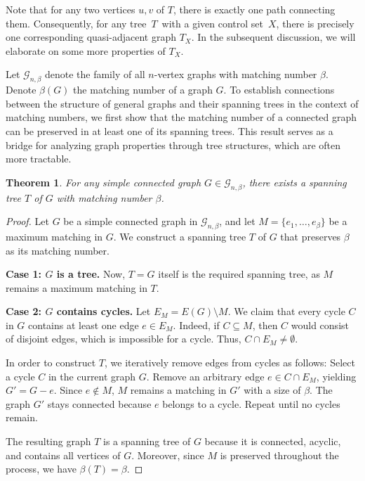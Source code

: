 \documentclass[12pt]{amsart}
\newtheorem{thm}{Theorem}[section]
\begin{document}
Note that for any two vertices \(u, v\) of $T$,  there is exactly one path connecting them. 
Consequently, for any tree $T$ with a given control set $X$, there is precisely one corresponding quasi-adjacent graph $T_X$. 
In the subsequent discussion, we will elaborate on some more properties of $T_X$.




Let $\mathcal{G}_{n,\beta}$ denote the family of all $n$-vertex graphs with matching number $\beta$. 
Denote  \( \beta(G)\) the matching number of a graph $G$.
To establish connections between the structure of general graphs and their spanning trees in the context of matching numbers, we first show that the matching number of a connected graph can be preserved in at least one of its spanning trees. This result serves as a bridge for analyzing graph properties through tree structures, which are often more tractable.
\begin{thm}\label{spanning_tree}
For any simple connected graph \( G \in \mathcal{G}_{n,\beta} \), there exists a spanning tree \( T \) of \( G \) with matching number \( \beta \).
\end{thm}

\begin{proof}
Let \( G \) be a simple connected graph in \( \mathcal{G}_{n,\beta} \), and let \( M = \{e_1, \dots, e_\beta\} \) be a maximum matching in \( G \). We construct a spanning tree \( T \) of \( G \) that preserves \( \beta \) as its matching number.

\textbf{Case 1: \( G \) is a tree.}  
Now, \( T = G \) itself is the required spanning tree, as \( M \) remains a maximum matching in \( T \).

\textbf{Case 2: \( G \) contains cycles.}  
Let \( E_M = E(G) \setminus M \). We claim that every cycle \( C \) in \( G \) contains at least one edge \( e \in E_M \). Indeed, if \( C \subseteq M \), then \( C \) would consist of disjoint edges, which is impossible for a cycle. Thus, \( C \cap E_M \neq \emptyset \).

In order to construct \( T \), we iteratively remove edges from cycles as follows:
Select a cycle \( C \) in the current graph $G$.
Remove an arbitrary edge \( e \in C \cap E_M \), yielding \( G' = G - e \).
Since \( e \notin M \),  \( M \) remains a matching in \( G' \) with a size of $\beta$.
The graph \( G' \) stays connected because \( e \) belongs to a cycle.
Repeat until no cycles remain.


The resulting graph \( T \) is a spanning tree of \( G \) because it is connected, acyclic, and contains all vertices of \( G \). Moreover, since \( M \) is preserved throughout the process, we have \( \beta(T) = \beta \).
\end{proof}
\end{document}
